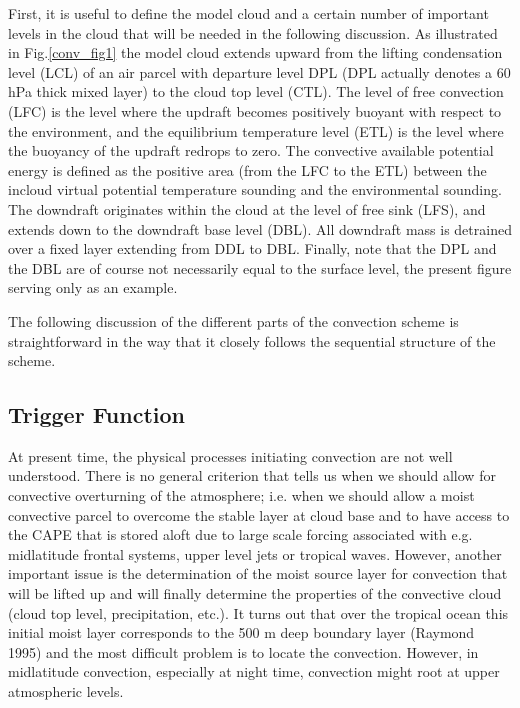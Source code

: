 First, it is useful to define the
model cloud and a certain number
of important levels in the cloud that will be needed in the
following discussion. As illustrated in Fig.\ref{conv_fig1}
the model cloud extends upward from the lifting condensation level (LCL) of
an air parcel with departure level DPL (DPL actually denotes a
60 hPa thick mixed layer) to
the cloud top level (CTL).
 The level of free convection (LFC)
is the level where the updraft becomes positively buoyant with respect
to the environment,
and the equilibrium temperature level (ETL) is
the level where the buoyancy of the updraft redrops to zero.
The convective available potential energy is defined as the positive area
(from the LFC to the ETL) between
the incloud virtual potential temperature sounding and the environmental
sounding.  The downdraft
originates within the cloud at the level of free sink (LFS), and extends down
to the downdraft base level (DBL). All downdraft mass is detrained over
a fixed layer extending from DDL to DBL.
Finally, note that the DPL and the DBL are
of course not necessarily equal to the surface level, the present figure serving
only as an example.


The following discussion of the different parts of the convection
scheme is straightforward in the way that it closely follows the sequential
structure of the scheme.



\subsection{Trigger Function}

At present time, the physical processes initiating convection
are not well understood. There is no general criterion that tells
us when we should allow for convective overturning of the atmosphere; i.e.
when we should allow a moist convective parcel to overcome the stable
layer at cloud base and to have access to the CAPE that is stored aloft
due to large scale forcing associated with
e.g. midlatitude frontal systems, upper level jets or tropical waves.
However, another important
issue is the determination of the moist source layer for convection that
will be lifted up and will finally determine the properties of the
convective cloud (cloud top level, precipitation, etc.).
It turns out that over the tropical ocean this initial
moist layer corresponds to the 500 m deep boundary layer (Raymond 1995)
and the most difficult
problem is to locate the convection. However, in midlatitude convection,
especially at night time, convection might root at upper
atmospheric levels.

